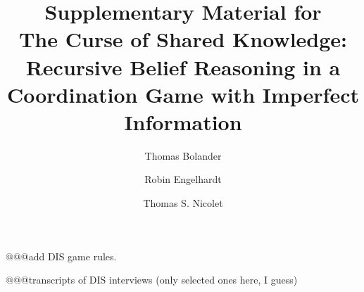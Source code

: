 \documentclass[a4paper,superscriptaddress,nofootinbib]{revtex4}
\begin{document}
\title{Supplementary Material for \\
The Curse of Shared Knowledge: Recursive Belief Reasoning in a Coordination Game with Imperfect Information}
\author{Thomas Bolander}
\author{Robin Engelhardt}
\author{Thomas S. Nicolet}

\maketitle

@@@add DIS game rules. 


@@@transcripts of DIS interviews (only selected ones here, I guess)
\end{document}
